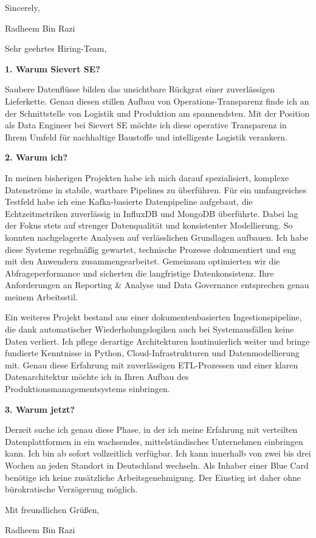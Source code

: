 \documentclass[11pt,a4paper]{coverletter}
\begin{document}
\closing{Sincerely,}{Radheem Bin Razi}

\clearpage
{}


\opening{Sehr geehrtes Hiring-Team,}

\vspace{8pt}\noindent\textbf{1. Warum Sievert SE?}\par\vspace{3pt}

Saubere Datenflüsse bilden das unsichtbare Rückgrat einer zuverlässigen Lieferkette. Genau diesen stillen Aufbau von Operations-Transparenz finde ich an der Schnittstelle von Logistik und Produktion am spannendsten. Mit der Position als Data Engineer bei Sievert SE möchte ich diese operative Transparenz in Ihrem Umfeld für nachhaltige Baustoffe und intelligente Logistik verankern.

\vspace{8pt}\noindent\textbf{2. Warum ich?}\par\vspace{3pt}

In meinen bisherigen Projekten habe ich mich darauf spezialisiert, komplexe Datenströme in stabile, wartbare Pipelines zu überführen. Für ein umfangreiches Testfeld habe ich eine Kafka-basierte Datenpipeline aufgebaut, die Echtzeitmetriken zuverlässig in InfluxDB und MongoDB überführte. Dabei lag der Fokus stets auf strenger Datenqualität und konsistenter Modellierung. So konnten nachgelagerte Analysen auf verlässlichen Grundlagen aufbauen. Ich habe diese Systeme regelmäßig gewartet, technische Prozesse dokumentiert und eng mit den Anwendern zusammengearbeitet. Gemeinsam optimierten wir die Abfrageperformance und sicherten die langfristige Datenkonsistenz. Ihre Anforderungen an Reporting \& Analyse und Data Governance entsprechen genau meinem Arbeitsstil.

Ein weiteres Projekt bestand aus einer dokumentenbasierten Ingestionspipeline, die dank automatischer Wiederholungslogiken auch bei Systemausfällen keine Daten verliert. Ich pflege derartige Architekturen kontinuierlich weiter und bringe fundierte Kenntnisse in Python, Cloud-Infrastrukturen und Datenmodellierung mit. Genau diese Erfahrung mit zuverlässigen ETL-Prozessen und einer klaren Datenarchitektur möchte ich in Ihren Aufbau des Produktionsmanagementsystems einbringen.

\vspace{8pt}\noindent\textbf{3. Warum jetzt?}\par\vspace{3pt}

Derzeit suche ich genau diese Phase, in der ich meine Erfahrung mit verteilten Datenplattformen in ein wachsendes, mittelständisches Unternehmen einbringen kann. Ich bin ab sofort vollzeitlich verfügbar. Ich kann innerhalb von zwei bis drei Wochen an jeden Standort in Deutschland wechseln. Als Inhaber einer Blue Card benötige ich keine zusätzliche Arbeitsgenehmigung. Der Einstieg ist daher ohne bürokratische Verzögerung möglich.

\closing{Mit freundlichen Grüßen,}{Radheem Bin Razi}
\end{document}
